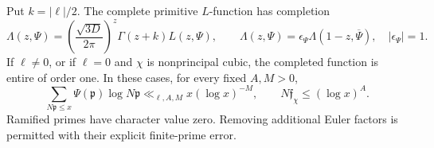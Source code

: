 \begin{lemma}\label{lem:angular-hecke}
Put $k=|\ell|/2$. The complete primitive $L$-function has completion
\begin{equation}\label{eq:angular-hecke-fe}
 \Lambda(z,\Psi)=\left(\frac{\sqrt{3D}}{2\pi}\right)^z
       \Gamma(z+k)L(z,\Psi),\qquad
 \Lambda(z,\Psi)=\epsilon_\Psi\Lambda(1-z,\overline\Psi),
 \quad |\epsilon_\Psi|=1.
\end{equation}
If $\ell\ne0$, or if $\ell=0$ and $\chi$ is nonprincipal cubic,
the completed function is entire of order one. In these cases, for
every fixed $A,M>0$,
\begin{equation}\label{eq:angular-prime-sw}
 \sum_{N\mathfrak p\le x}\Psi(\mathfrak p)\log N\mathfrak p
       \ll_{\ell,A,M}x(\log x)^{-M},
 \qquad N\mathfrak f_\chi\le(\log x)^A.
\end{equation}
Ramified primes have character value zero. Removing additional
Euler factors is permitted with their explicit finite-prime error.
\end{lemma}

